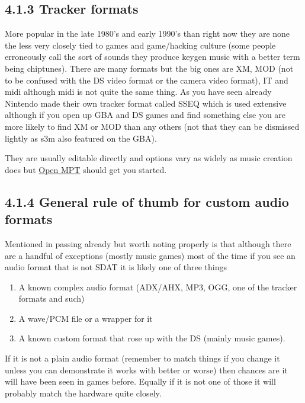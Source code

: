 \documentclass[
]{book}
\providecommand{\tightlist}{%
  \setlength{\itemsep}{0pt}\setlength{\parskip}{0pt}}
\begin{document}
\hypertarget{tracker-formats}{%
\subsection{4.1.3 Tracker formats}\label{tracker-formats}}

More popular in the late 1980's and early 1990's than right now they are none the less very closely tied to games and game/hacking culture (some people erroneously call the sort of sounds they produce keygen music with a better term being chiptunes). There are many formats but the big ones are XM, MOD (not to be confused with the DS video format or the camera video format), IT and midi although midi is not quite the same thing. As you have seen already Nintendo made their own tracker format called SSEQ which is used extensive although if you open up GBA and DS games and find something else you are more likely to find XM or MOD than any others (not that they can be dismissed lightly as s3m also featured on the GBA).

They are usually editable directly and options vary as widely as music creation does but \href{http://openmpt.org/}{Open MPT} should get you started.

\hypertarget{general-rule-of-thumb-for-custom-audio-formats}{%
\subsection{4.1.4 General rule of thumb for custom audio formats}\label{general-rule-of-thumb-for-custom-audio-formats}}

Mentioned in passing already but worth noting properly is that although there are a handful of exceptions (mostly music games) most of the time if you see an audio format that is not SDAT it is likely one of three things

\begin{enumerate}
\def\labelenumi{\arabic{enumi}.}
\tightlist
\item
  A known complex audio format (ADX/AHX, MP3, OGG, one of the tracker formats and such)
\item
  A wave/PCM file or a wrapper for it
\item
  A known custom format that rose up with the DS (mainly music games).
\end{enumerate}

If it is not a plain audio format (remember to match things if you change it unless you can demonstrate it works with better or worse) then chances are it will have been seen in games before. Equally if it is not one of those it will probably match the hardware quite closely.
\end{document}
